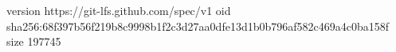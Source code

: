 version https://git-lfs.github.com/spec/v1
oid sha256:68f397b56f219b8c9998b1f2c3d27aa0dfe13d1b0b796af582c469a4c0ba158f
size 197745
